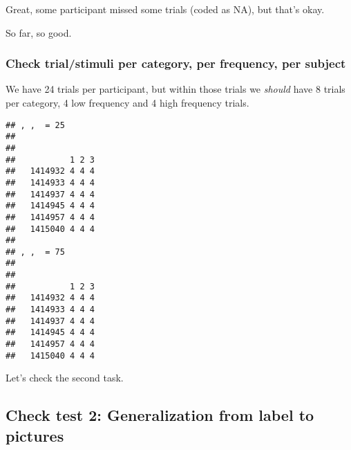 \documentclass[
]{article}
\newenvironment{Shaded}{\begin{snugshade}}{\end{snugshade}}
\newcommand{\KeywordTok}[1]{\textcolor[rgb]{0.13,0.29,0.53}{\textbf{#1}}}
\newcommand{\NormalTok}[1]{#1}
\newcommand{\OperatorTok}[1]{\textcolor[rgb]{0.81,0.36,0.00}{\textbf{#1}}}
\newcommand{\StringTok}[1]{\textcolor[rgb]{0.31,0.60,0.02}{#1}}
\begin{document}
Great, some participant missed some trials (coded as NA), but that's
okay.

So far, so good.

\hypertarget{check-trialstimuli-per-category-per-frequency-per-subject}{%
\subsubsection{Check trial/stimuli per category, per frequency, per
subject}\label{check-trialstimuli-per-category-per-frequency-per-subject}}

We have 24 trials per participant, but within those trials we
\emph{should} have 8 trials per category, 4 low frequency and 4 high
frequency trials.

\begin{Shaded}
\end{Shaded}

\begin{verbatim}
## , ,  = 25
## 
##          
##           1 2 3
##   1414932 4 4 4
##   1414933 4 4 4
##   1414937 4 4 4
##   1414945 4 4 4
##   1414957 4 4 4
##   1415040 4 4 4
## 
## , ,  = 75
## 
##          
##           1 2 3
##   1414932 4 4 4
##   1414933 4 4 4
##   1414937 4 4 4
##   1414945 4 4 4
##   1414957 4 4 4
##   1415040 4 4 4
\end{verbatim}

Let's check the second task.

\hypertarget{check-test-2-generalization-from-label-to-pictures}{%
\subsection{Check test 2: Generalization from label to
pictures}\label{check-test-2-generalization-from-label-to-pictures}}

\begin{Shaded}
\end{Shaded}
\end{document}
